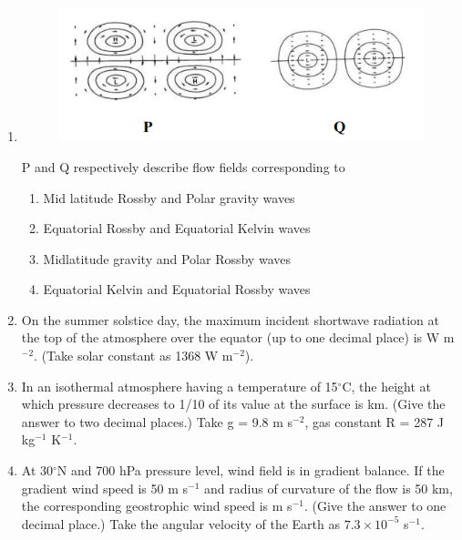 \documentclass[a4paper,10pt]{article}
\begin{document}
\begin{enumerate}
    \item 
    \begin{figure}[H] \centering \includegraphics[width=\columnwidth]{q13_atmos_2018.png} \caption*{} \label{fig:q13_atmos_2018} \end{figure}
    P and Q respectively describe flow fields corresponding to
    \hfill{}
    \begin{enumerate}[label=\Alph*)]
        \item Mid latitude Rossby and Polar gravity waves
        \item Equatorial Rossby and Equatorial Kelvin waves
        \item Midlatitude gravity and Polar Rossby waves
        \item Equatorial Kelvin and Equatorial Rossby waves
    \end{enumerate}

    \item On the summer solstice day, the maximum incident shortwave radiation at the top of the atmosphere over the equator (up to one decimal place) is \underline{\hspace{2cm}} W m$^{-2}$. (Take solar constant as 1368 W m$^{-2}$).
    \hfill{}

    \item In an isothermal atmosphere having a temperature of 15$^{\circ}$C, the height at which pressure decreases to 1/10 of its value at the surface is \underline{\hspace{2cm}} km. (Give the answer to two decimal places.) Take g = 9.8 m s$^{-2}$, gas constant R = 287 J kg$^{-1}$ K$^{-1}$.
    \hfill{}

    \item At 30$^{\circ}$N and 700 hPa pressure level, wind field is in gradient balance. If the gradient wind speed is 50 m s$^{-1}$ and radius of curvature of the flow is 50 km, the corresponding geostrophic wind speed is \underline{\hspace{2cm}} m s$^{-1}$. (Give the answer to one decimal place.) Take the angular velocity of the Earth as $7.3 \times 10^{-5}$ s$^{-1}$.
    \hfill{}


\end{enumerate}
\end{document}
